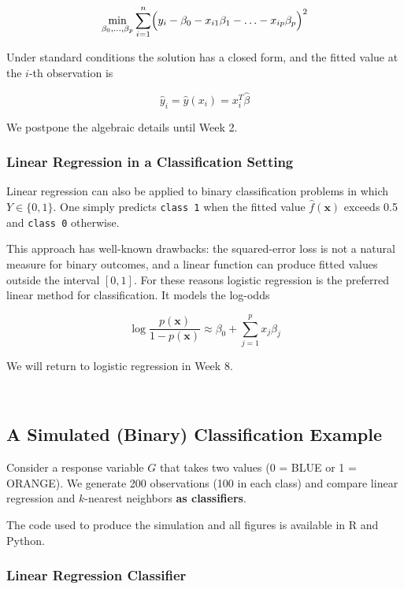 \documentclass[
]{book}
\begin{document}
\[\min_{\beta_0, \ldots, \beta_p} \sum_{i=1}^{n} \Bigl( y_i - \beta_0 - x_{i1}\beta_1 - \ldots - x_{ip} \beta_p \Bigr)^2\]

Under standard conditions the solution has a closed form, and the fitted value at the \(i\)-th observation is

\[\hat{y}_i = \hat{y}(x_i) = x_i^T \hat{\beta}\]

We postpone the algebraic details until Week 2.

\subsubsection*{Linear Regression in a Classification Setting}\label{linear-regression-in-a-classification-setting}

Linear regression can also be applied to binary classification problems in which \(Y\in\{0,1\}\). One simply predicts \texttt{class\ 1} when the fitted value \(\hat{f}(\mathbf{x})\) exceeds 0.5 and \texttt{class\ 0} otherwise.

This approach has well-known drawbacks: the squared-error loss is not a natural measure for binary outcomes, and a linear function can produce fitted values outside the interval \([0,1]\). For these reasons logistic regression is the preferred linear method for classification. It models the log-odds

\[\log \frac{p(\mathbf{x})}{1-p(\mathbf{x}) } \approx \beta_0 + \sum_{j=1}^{p} x_j \beta_j\]

We will return to logistic regression in Week 8.

~

\subsection{A Simulated (Binary) Classification Example}\label{a-simulated-binary-classification-example}

Consider a response variable \(G\) that takes two values (0 = BLUE or 1 = ORANGE). We generate 200 observations (100 in each class) and compare linear regression and \(k\)-nearest neighbors \textbf{as classifiers}.

The code used to produce the simulation and all figures is available in R and Python.

\subsubsection*{Linear Regression Classifier}\label{linear-regression-classifier}
\end{document}
